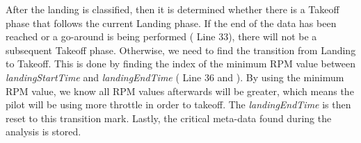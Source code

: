     After the landing is classified, then it is determined whether there is a Takeoff phase that follows the current Landing phase.  If the end of the data has been reached or a go-around is being performed ( Line 33), there will not be a subsequent Takeoff phase.  Otherwise, we need to find the transition from Landing to Takeoff.  This is done by finding the index of the minimum RPM value between \textit{landingStartTime} and \textit{landingEndTime} ( Line 36 and ).  By using the minimum RPM value, we know all RPM values afterwards will be greater, which means the pilot will be using more throttle in order to takeoff.  The \textit{landingEndTime} is then reset to this transition mark.  Lastly, the critical meta-data found during the analysis is stored.
    
